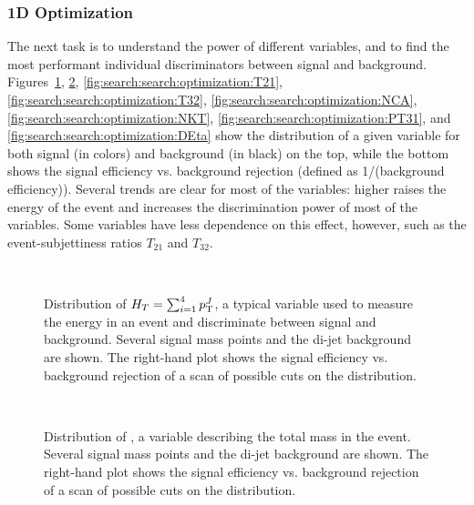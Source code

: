 \subsubsection{1D Optimization}

The next task is to understand the power of different variables, and to find the most performant individual discriminators between signal and background. Figures~\ref{fig:search:search:optimization:HT}, \ref{fig:search:search:optimization:MJ}, \ref{fig:search:search:optimization:T21}, \ref{fig:search:search:optimization:T32}, \ref{fig:search:search:optimization:NCA}, \ref{fig:search:search:optimization:NKT}, \ref{fig:search:search:optimization:PT31}, and \ref{fig:search:search:optimization:DEta} show the distribution of a given variable for both signal (in colors) and background (in black) on the top, while the bottom shows the signal efficiency vs. background rejection (defined as 1/(background efficiency)). Several trends are clear for most of the variables: higher \mgluino raises the energy of the event and increases the discrimination power of most of the variables. Some variables have less dependence on this effect, however, such as the event-subjettiness ratios $T_{21}$ and $T_{32}$.


\begin{figure}
\centering
{}\\
\caption{Distribution of $H_T = \sum_{i=1}^4 p_{\text{T}}^J$, a typical variable used to measure the energy in an event and discriminate between signal and background. Several signal mass points and the \herwigpp di-jet background are shown. The right-hand plot shows the signal efficiency vs. background rejection of a scan of possible cuts on the \HT distribution.}
\label{fig:search:search:optimization:HT}
\end{figure}




\begin{figure}
\centering
{}\\
\caption{Distribution of \MJ, a variable describing the total mass in the event. Several signal mass points and the \herwigpp di-jet background are shown. The right-hand plot shows the signal efficiency vs. background rejection of a scan of possible cuts on the \MJ distribution.}
\label{fig:search:search:optimization:MJ}
\end{figure}

